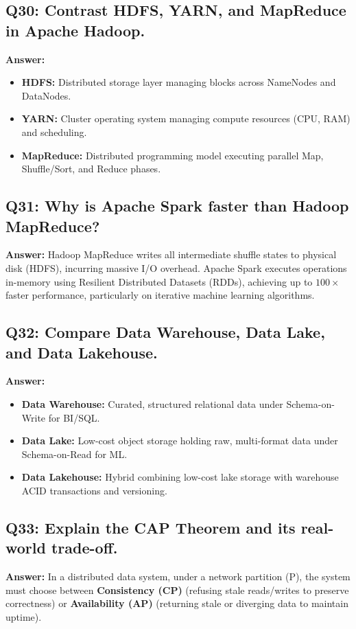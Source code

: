 \subsection*{Q30: Contrast HDFS, YARN, and MapReduce in Apache Hadoop.}
\textbf{Answer:}
\begin{itemize}
    \item \textbf{HDFS:} Distributed storage layer managing blocks across NameNodes and DataNodes.
    \item \textbf{YARN:} Cluster operating system managing compute resources (CPU, RAM) and scheduling.
    \item \textbf{MapReduce:} Distributed programming model executing parallel Map, Shuffle/Sort, and Reduce phases.
\end{itemize}

\subsection*{Q31: Why is Apache Spark faster than Hadoop MapReduce?}
\textbf{Answer:} Hadoop MapReduce writes all intermediate shuffle states to physical disk (HDFS), incurring massive I/O overhead. Apache Spark executes operations in-memory using Resilient Distributed Datasets (RDDs), achieving up to $100\times$ faster performance, particularly on iterative machine learning algorithms.

\subsection*{Q32: Compare Data Warehouse, Data Lake, and Data Lakehouse.}
\textbf{Answer:}
\begin{itemize}
    \item \textbf{Data Warehouse:} Curated, structured relational data under Schema-on-Write for BI/SQL.
    \item \textbf{Data Lake:} Low-cost object storage holding raw, multi-format data under Schema-on-Read for ML.
    \item \textbf{Data Lakehouse:} Hybrid combining low-cost lake storage with warehouse ACID transactions and versioning.
\end{itemize}

\subsection*{Q33: Explain the CAP Theorem and its real-world trade-off.}
\textbf{Answer:} In a distributed data system, under a network partition (P), the system must choose between \textbf{Consistency (CP)} (refusing stale reads/writes to preserve correctness) or \textbf{Availability (AP)} (returning stale or diverging data to maintain uptime).

